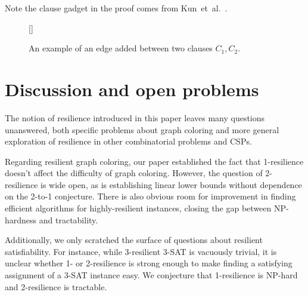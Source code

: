 \documentclass{llncs}
\begin{document}
Note the clause gadget in the proof comes from Kun~et~al.~\cite{KunPR13}.



\begin{figure}
[\FBwidth]
{\caption{An example of an edge added between two clauses $C_1,
C_2$.}\label{fig:clause-clause-example}}
{}
\end{figure}




\section{Discussion and open problems} \label{sec:open-problems}

The notion of resilience introduced in this paper leaves many questions
unanswered, both specific problems about graph coloring and more
general exploration of resilience in other combinatorial problems and CSPs. 

Regarding resilient graph coloring, our paper established the fact that
1-resilience doesn't affect the difficulty of graph coloring. However, the
question of 2-resilience is wide open, as is establishing linear lower bounds
without dependence on the 2-to-1 conjecture. There is also obvious room for
improvement in finding efficient algorithms for highly-resilient instances,
closing the gap between NP-hardness and tractability.

Additionally, we only scratched the surface of questions about resilient
satisfiability. For instance, while 3-resilient 3-SAT is vacuously trivial, it
is unclear whether 1- or 2-resilience is strong enough to make finding a
satisfying assignment of a 3-SAT instance easy. We conjecture that 1-resilience
is NP-hard and 2-resilience is tractable.
\end{document}
